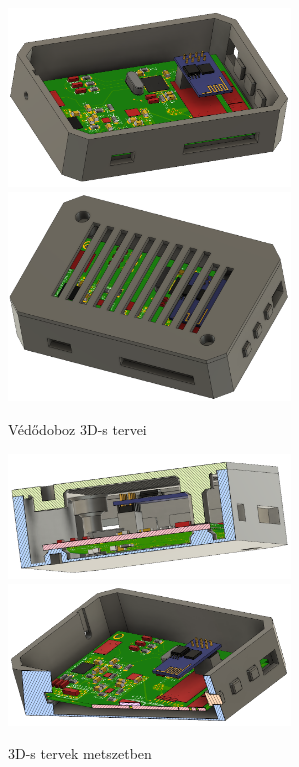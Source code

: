 \documentclass[../main.tex]{subfiles}
\begin{document}
            \begin{figure}[h!]
                \centering
                    \includegraphics[width=7.5cm]{resources/pcb_res/fusion_case_body.png}
                    \includegraphics[width=7.5cm]{resources/pcb_res/fusion_case_cooling_ribs.png}
                    \caption{Védődoboz 3D-s tervei}
                    \label{fig:fusion_case_body}
            \end{figure}
            
            \begin{figure}[h!]
                \centering
                    \includegraphics[width=7.5cm]{resources/pcb_res/fusion_case_cut.png}
                    \includegraphics[width=7.5cm]{resources/pcb_res/fusion_case_cut2.png}
                    \caption{3D-s tervek metszetben}
                    \label{fig:fusion_case_body_cut}
            \end{figure}
            
\end{document}
